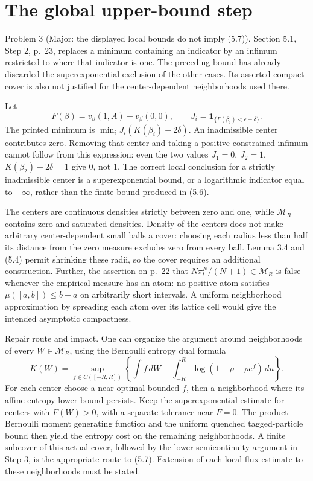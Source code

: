 \documentclass[10pt]{article}
\begin{document}
\section*{The global upper-bound step}
Problem 3 (Major: the displayed local bounds do not imply (5.7)).  Section 5.1, Step 2, p. 23, replaces a minimum containing an indicator by an infimum restricted to where that indicator is one. The preceding bound has already discarded the superexponential exclusion of the other cases. Its asserted compact cover is also not justified for the center-dependent neighborhoods used there.\par
Let \[F(\beta)=v_\beta(1,A)-v_\beta(0,0),\qquad
 J_i=\mathbf1_{\{F(\beta_i)<\epsilon+\delta\}}.\] The printed minimum is \(\min_i J_i(K(\beta_i)-2\delta)\). An inadmissible center contributes zero. Removing that center and taking a positive constrained infimum cannot follow from this expression: even the two values \(J_1=0\), \(J_2=1\), \(K(\beta_2)-2\delta=1\) give \(0\), not \(1\). The correct local conclusion for a strictly inadmissible center is a superexponential bound, or a logarithmic indicator equal to \(-\infty\), rather than the finite bound produced in (5.6).\par
The centers are continuous densities strictly between zero and one, while \(\mathcal M_R\) contains zero and saturated densities. Density of the centers does not make arbitrary center-dependent small balls a cover: choosing each radius less than half its distance from the zero measure excludes zero from every ball. Lemma 3.4 and (5.4) permit shrinking these radii, so the cover requires an additional construction. Further, the assertion on p. 22 that \(N\pi_t^N/(N+1)\in\mathcal M_R\) is false whenever the empirical measure has an atom: no positive atom satisfies \(\mu([a,b])\leq b-a\) on arbitrarily short intervals. A uniform neighborhood approximation by spreading each atom over its lattice cell would give the intended asymptotic compactness.\par
Repair route and impact. One can organize the argument around neighborhoods of every \(W\in\mathcal M_R\), using the Bernoulli entropy dual formula \[K(W)=\sup_{f\in C([-R,R])}
 \left\{\int f\,dW-\int_{-R}^R\log(1-\rho+\rho e^f)\,du\right\}.\] For each center choose a near-optimal bounded \(f\), then a neighborhood where its affine entropy lower bound persists. Keep the superexponential estimate for centers with \(F(W)>0\), with a separate tolerance near \(F=0\). The product Bernoulli moment generating function and the uniform quenched tagged-particle bound then yield the entropy cost on the remaining neighborhoods. A finite subcover of this actual cover, followed by the lower-semicontinuity argument in Step 3, is the appropriate route to (5.7). Extension of each local flux estimate to these neighborhoods must be stated.\par
\end{document}
